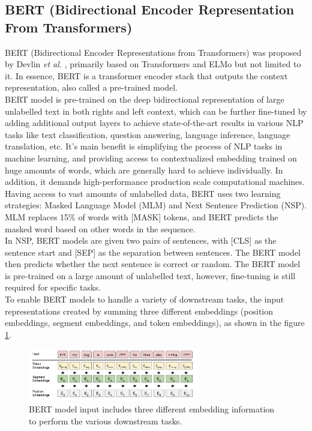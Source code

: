 \documentclass[%
	BCOR=8mm, %
	DIV=12,
	toc=bibliography, %
	toc=listof, %
	oneside, %
	egregdoesnotlikesansseriftitles, %
	]{scrbook}
\begin{document}
\subsection{BERT (Bidirectional Encoder Representation From Transformers)}
BERT (Bidirectional Encoder Representations from Transformers) was proposed by Devlin \textit{et al.} \cite{devlin_bert_2019-1}, primarily based on Transformers \cite{vaswani_attention_2017} and ELMo \cite{peters_deep_2018-3} but not limited to it. In essence, BERT is a transformer encoder stack that outputs the context representation, also called a pre-trained model. \\
BERT model is pre-trained on the deep bidirectional representation of large unlabelled text in both rights and left context, which can be further fine-tuned by adding additional output layers to achieve state-of-the-art results in various NLP tasks like text classification, question answering, language inference, language translation, etc. It's main benefit is simplifying the process of NLP tasks in machine learning, and providing access to contextualized embedding trained on huge amounts of words, which are generally hard to achieve individually. In addition, it demands high-performance production scale computational machines. \\
Having access to vast amounts of unlabelled data,  BERT uses two learning strategies: Masked Language Model (MLM) and Next Sentence Prediction (NSP). MLM replaces 15\% of words with [MASK] tokens, and BERT predicts the masked word based on other words in the sequence.\\
In NSP, BERT models are given two pairs of sentences, with [CLS] as the sentence start and [SEP] as the separation between sentences. The BERT model then predicts whether the next sentence is correct or random. The BERT model is pre-trained on a large amount of unlabelled text, however, fine-tuning is still required for specific tasks.\\
To enable BERT models to handle a variety of downstream tasks, the input representations created by summing three different embeddings (position embeddings, segment embeddings, and token embeddings), as shown in the figure \ref{fig:bert_inp}.
\begin{figure}[H]
    \centering
    \includegraphics[width=0.67\textwidth]{img/bert_inp.png}
    \caption[Three different embeddings in BERT model]{\small BERT model input includes three different embedding information to perform the various downstream tasks\cite{devlin_bert_2019-1}. }
    \label{fig:bert_inp}
\end{figure}
\end{document}
